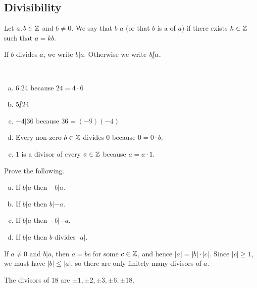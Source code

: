\documentclass[11pt,fleqn,dvipsnames,usenames]{article}
\begin{document}
\subsection{Divisibility}

\begin{definition} Let $a,b\in\mathbb{Z}$ and $b\neq 0$.  We say that $b$  $a$ (or that $b$ is a  of $a$) if there exists $k\in\mathbb{Z}$ such that $a = kb$.
\end{definition}

\notation If $b$ divides $a$, we write $b | a$.  Otherwise we write $b|\kern-0.9ex{/} a$.
\vsp

\begin{examples}~
\begin{enumerate}[(a)]
\item $6 | 24$ because $24 = 4\cdot 6$
\item $5|\kern-0.9ex{/} 24$
\item $-4 | 36$ because $36 = (-9)(-4)$
\item Every non-zero $b\in\mathbb{Z}$ divides $0$ because $0 = 0\cdot b$.
\item $1$ is a divisor of every $a\in\mathbb{Z}$ because $a = a\cdot 1$.
\end{enumerate}
\end{examples}
%
\begin{exercise} Prove the following.
\begin{enumerate}[(a)]
\item If $b|a$ then $-b|a$.
\item If $b|a$ then $b|-a$.
\item If $b|a$ then $-b|-a$.
\item If $b|a$ then $b$ divides $|a|$.
\end{enumerate}
\end{exercise}

\begin{remark}
If $a\neq 0$ and $b|a$, then $a = bc$ for some $c\in\mathbb{Z}$, and hence $|a| = |b|\cdot |c|$.  Since $|c|\geq 1$, we must have $|b|\leq |a|$, so there are only finitely many divisors of $a$.
\end{remark}

\begin{example}
The divisors of $18$ are $\pm1, \pm2,\pm3,\pm6,\pm18$.
\end{example}
\end{document}
